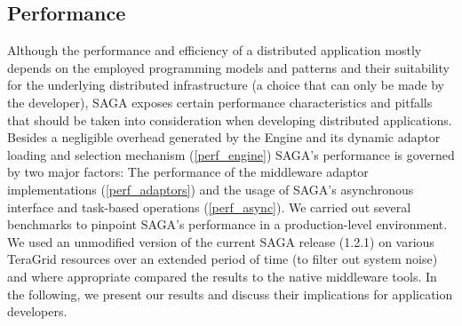 \subsection{Performance}\label{performance}

Although the performance and efficiency of a distributed application mostly depends on the employed programming models and patterns and their suitability for the underlying distributed infrastructure (a choice that can only be made by the developer), SAGA exposes certain performance characteristics and pitfalls that should be taken into consideration when developing distributed applications. Besides a negligible overhead generated by the Engine and its dynamic adaptor loading and selection mechanism (\ref{perf_engine}) SAGA's performance is governed by two major factors: The performance of the middleware adaptor implementations (\ref{perf_adaptors}) and the usage of SAGA's asynchronous interface and task-based operations (\ref{perf_async}). We carried out several benchmarks to pinpoint SAGA’s performance in a production-level environment.   We used an unmodified version of the current SAGA release (1.2.1) on various TeraGrid resources over an extended period of time (to filter out system noise) and where appropriate compared the results to the native middleware tools. In the following, we present our results and discuss their implications for application developers. 

